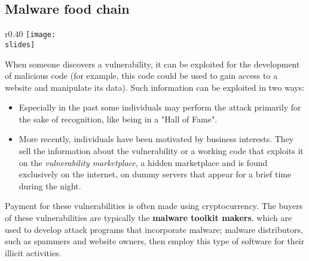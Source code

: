 \subsection*{Malware food chain}
\begin{wrapfigure}{r}{0.40\textwidth}
  \centering
  \texttt{[image: \\slides]}
\end{wrapfigure}
When someone discovers a vulnerability, it can be exploited for the development of malicious code (for example, this code could be used to gain access to a website and manipulate its data). Such information can be exploited in two ways:
\begin{itemize}
  \item Especially in the past some individuals may perform the attack primarily for the sake of recognition, like being in a "Hall of Fame".

  \item More recently, individuals have been motivated by business interests. They sell the information about the vulnerability or a working code that exploits it on the \emph{vulnerability marketplace}, a hidden marketplace and is found exclusively on the internet, on dummy servers that appear for a brief time during the night.
\end{itemize}

Payment for these vulnerabilities is often made using cryptocurrency. The buyers of these vulnerabilities are typically the \textbf{malware toolkit makers}, which are used to develop attack programs that incorporate malware; malware distributors, such as spammers and website owners, then employ this type of software for their illicit activities.


